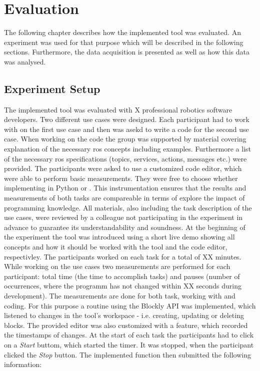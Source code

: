\chapter{Evaluation}
The following chapter describes how the implemented tool was evaluated. An experiment was used for that purpose which will be described in the following sections. Furthermore, the data acquisition is presented as well as how this data was analysed.

\section{Experiment Setup}
The implemented tool was evaluated with X professional robotics software developers. Two different use cases were designed. Each participant had to work with \toolname{} on the first use case and then was asekd to write a code for the second use case. When working on the code the group was supported by material covering explanation of the necessary \gls{ros} concepts including examples. Furthermore a list of the necessary \gls{ros} specifications (topics, services, actions, messages etc.) were provided. The participants were asked to use a customized code editor, which were able to perform basic measurements. They were free to choose whether implementing in Python or \Cpp{}. This instrumentation ensures that the results and measurements of both tasks are compareable in terms of explore the impact of programming knowledge. All materials, also including the task description of the use cases, were reviewed by a colleague not participating in the experiment in advance to guarantee its understandability and soundness. At the beginning of the experiment the tool was introduced using a short live demo showing all concepts and how it should be worked with the tool and the code editor, respectivley. The participants worked on each task for a total of XX minutes. \\
While working on the use cases two measurements are performed for each participant: total time (the time to accomplish tasks) and pauses (number of occurrences, where the programm has not changed within XX seconds during development). The measurements are done for both task, working with \toolname{} and coding. For this purpose a routine using the Blockly API was implemented, which listened to changes in the tool's workspace - i.e. creating, updating or deleting blocks. The provided editor was also customized with a feature, which recorded the timestamps of changes. At the start of each task the participants had to click on a \textit{Start} buttom, which started the timer. It was stopped, when the participant clicked the \textit{Stop} button. The implemented function then submitted the following information:

